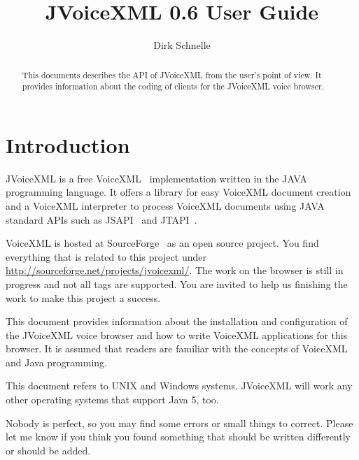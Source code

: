 \documentclass[11pt,a4paper]{article}
\title{JVoiceXML 0.6 User Guide}
\author{Dirk Schnelle}
\date{}
\begin{document}
\pagestyle{empty}

\maketitle

\pagestyle{headings}

\tableofcontents

\newpage

\begin{abstract}
This documents describes the API of JVoiceXML from the user's point of
view. It provides information about the coding of clients for
the JVoiceXML voice browser.
\end{abstract}


\section{Introduction}
\label{sec:introduction}

JVoiceXML is a free VoiceXML~\cite{w3.org:voicexml} implementation written in 
the JAVA programming language. It offers a library for easy VoiceXML
document creation and a VoiceXML interpreter to process 
VoiceXML documents using JAVA standard APIs such as JSAPI~\cite{sun:jsapi} and
JTAPI~\cite{sun:jsapi}.

VoiceXML is hosted at SourceForge~\cite{sourceforge} as an open source project.
You find everything that is related to this project under
\url{http://sourceforge.net/projects/jvoicexml/}.
The work on the browser is still in progress and not all tags are
supported. You are invited to help us finishing the work to make this
project a success.

This document provides information about the installation and
configuration of the JVoiceXML voice browser and how to write
VoiceXML applications for this browser.
It is assumed that readers are familiar with the concepts of
VoiceXML and Java programming.

This document refers to UNIX and Windows systems. JVoiceXML will work 
any other operating systems that support Java 5, too.

Nobody is perfect, so you may find some errors or small things to correct.
Please let me know if you think you found something that should be written
differently or should be added.
\end{document}
